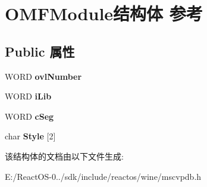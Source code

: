 \hypertarget{struct_o_m_f_module}{}\section{O\+M\+F\+Module结构体 参考}
\label{struct_o_m_f_module}
\subsection*{Public 属性}
\begin{DoxyCompactItemize}
\item 
\mbox{\label{struct_o_m_f_module_aa7c562b2bd50acefb3c07624445e65f9}} 
W\+O\+RD {\bfseries ovl\+Number}
\item 
\mbox{\label{struct_o_m_f_module_a6e81c8b1d14f792045f27d6e069cd5f9}} 
W\+O\+RD {\bfseries i\+Lib}
\item 
\mbox{\label{struct_o_m_f_module_a7bc80e6719e9a87e57ec0d78241e1d4f}} 
W\+O\+RD {\bfseries c\+Seg}
\item 
\mbox{\label{struct_o_m_f_module_a4af487b63e4e9a14bc33888b259250bf}} 
char {\bfseries Style} \mbox{[}2\mbox{]}
\end{DoxyCompactItemize}


该结构体的文档由以下文件生成\+:\begin{DoxyCompactItemize}
\item 
E\+:/\+React\+O\+S-\/0../sdk/include/reactos/wine/mscvpdb.\+h\end{DoxyCompactItemize}
